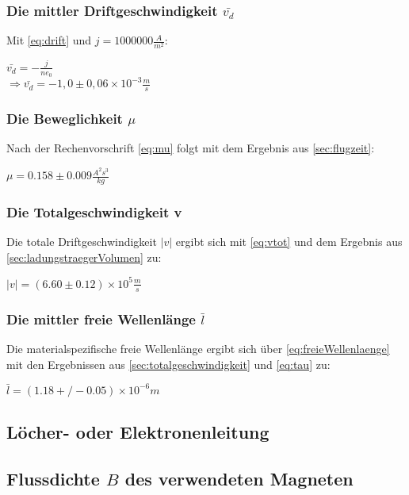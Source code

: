 \subsubsection{Die mittler Driftgeschwindigkeit $\bar{v_d}$}
\label{sec:driftgeschwindigkeit}
Mit \autoref{eq:drift} und $j=1000000\frac{A}{m^2}$:
\begin{center}
    $\bar{v_d}=-\frac{j}{ne_0}$\\
    $\Rightarrow \bar{v_d}=-1,0 \pm 0,06 \times 10^{-3} \frac{m}{s}$
\end{center}
\subsubsection{Die Beweglichkeit $\mu$}
\label{sec:beweglichkeit}
Nach der Rechenvorschrift \autoref{eq:mu} folgt mit dem Ergebnis aus \autoref{sec:flugzeit}:
\begin{center}
    $\mu=0.158\pm0.009 \frac{A^2s^3}{kg} $
\end{center}
\subsubsection{Die Totalgeschwindigkeit v}
\label{sec:totalgeschwindigkeit}
Die totale Driftgeschwindigkeit $\vert v \vert$ ergibt sich mit \autoref{eq:vtot} und dem Ergebnis aus 
\autoref{sec:ladungstraegerVolumen} zu:
\begin{center}
    $\vert v \vert=(6.60\pm0.12)\times10^5 \frac{m}{s}$
\end{center}

\subsubsection{Die mittler freie Wellenlänge $\bar{l}$}
\label{sec:wellenlaenge}
Die materialspezifische freie Wellenlänge ergibt sich über \autoref{eq:freieWellenlaenge} mit den Ergebnissen 
aus \autoref{sec:totalgeschwindigkeit} und \autoref{eq:tau} zu:
\begin{center}
    $\bar{l}=(1.18+/-0.05)\times 10^{-6} m$
\end{center}
\subsection{Löcher- oder Elektronenleitung}
\label{sec:leiterart}
\subsection{Flussdichte $B$ des verwendeten Magneten}

